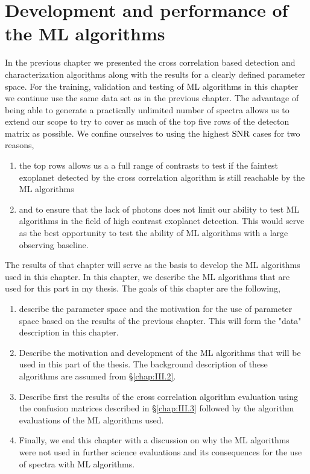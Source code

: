 \chapter{Development and performance of the ML algorithms}
\label{chap:III.5}
In the previous chapter we presented the cross correlation based detection and characterization algorithms along with the results for a clearly defined parameter space.
For the training, validation and testing of ML algorithms in this chapter we continue use the same data set as in the previous chapter.
The advantage of being able to generate a practically unlimited number of spectra allows us to extend our scope to try to cover as much of the top five rows of the detecton matrix as possible.
We confine ourselves to using the highest $\rm{SNR}$ cases for two reasons,
\begin{enumerate}
    \item the top rows allows us a a full range of contrasts to test if the faintest exoplanet detected by the cross correlation algorithm is still reachable by the ML algorithms
    \item and to ensure that the lack of photons does not limit our ability to test ML algorithms in the field of high contrast exoplanet detection.
    This would serve as the best opportunity to test the ability of ML algorithms with a large observing baseline.
\end{enumerate}
The results of that chapter will serve as the basis to develop the ML algorithms used in this chapter.
In this chapter, we describe the ML algorithms that are used for this part in my thesis. 
The goals of this chapter are the following,
\begin{enumerate}
    \item describe the parameter space and the motivation for the use of parameter space based on the results of the previous chapter. This will form the "data" description in this chapter.
    \item Describe the motivation and development of the ML algorithms that will be used in this part of the thesis. The background description of these algorithms are assumed from §\ref{chap:III.2}. 
    \item Describe first the results of the cross correlation algorithm evaluation using the confusion matrices described in §\ref{chap:III.3} followed by the algorithm evaluations of the ML algorithms used.
    \item Finally, we end this chapter with a discussion on why the ML algorithms were not used in further science evaluations and its consequences for the use of spectra with ML algorithms.
\end{enumerate}

